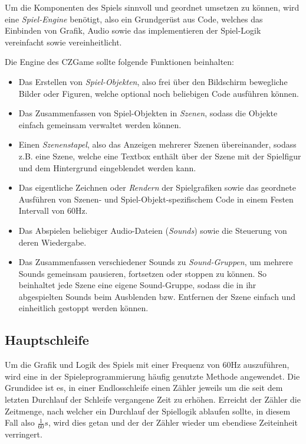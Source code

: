 Um die Komponenten des Spiels sinnvoll und geordnet umsetzen zu
können, wird eine \textit{Spiel-Engine} benötigt, also ein
Grundgerüst aus Code, welches das Einbinden von Grafik, Audio sowie
das implementieren der Spiel-Logik vereinfacht sowie vereinheitlicht.

Die Engine des CZGame sollte folgende Funktionen
beinhalten:

\begin{itemize}
	\item Das Erstellen von \textit{Spiel-Objekten}, also
	frei über den Bildschirm bewegliche Bilder oder Figuren,
	welche optional noch beliebigen Code ausführen können.
	\item Das Zusammenfassen von Spiel-Objekten in \textit{Szenen},
	sodass die Objekte einfach gemeinsam verwaltet werden können.
	\item Einen \textit{Szenenstapel}, also das Anzeigen mehrerer Szenen übereinander, sodass z.B.
	eine Szene, welche eine Textbox enthält über der Szene mit
	der Spielfigur und dem Hintergrund eingeblendet werden kann.
	\item Das eigentliche \glqq{}Zeichnen\grqq{} oder \textit{Rendern} der Spielgrafiken
	sowie das geordnete Ausführen von Szenen- und Spiel-Objekt-spezifischem
	Code in einem Festen Intervall von 60Hz.
	\item Das Abspielen beliebiger Audio-Dateien (\textit{Sounds})
	sowie die Steuerung von deren Wiedergabe.
	\item Das Zusammenfassen verschiedener Sounds zu \textit{Sound-Gruppen},
	um mehrere Sounds gemeinsam pausieren, fortsetzen oder stoppen zu können.
	So beinhaltet jede Szene eine eigene Sound-Gruppe, sodass die in ihr
	abgespielten Sounds beim Ausblenden bzw. Entfernen der Szene einfach
	und einheitlich gestoppt werden können.
\end{itemize}


\subsection{Hauptschleife} \label{idee:engine:hauptschleife}

Um die Grafik und Logik des Spiels mit einer Frequenz von 60Hz
auszuführen, wird eine in der Spieleprogrammierung häufig
genutzte Methode angewendet. Die Grundidee ist es, in einer
Endlosschleife einen Zähler jeweils um die seit dem letzten
Durchlauf der Schleife vergangene Zeit zu erhöhen. Erreicht der
Zähler die Zeitmenge, nach welcher ein Durchlauf der Spiellogik
ablaufen sollte, in diesem Fall also $\frac{1}{60}s$, wird dies
getan und der der Zähler wieder um ebendiese Zeiteinheit verringert.

